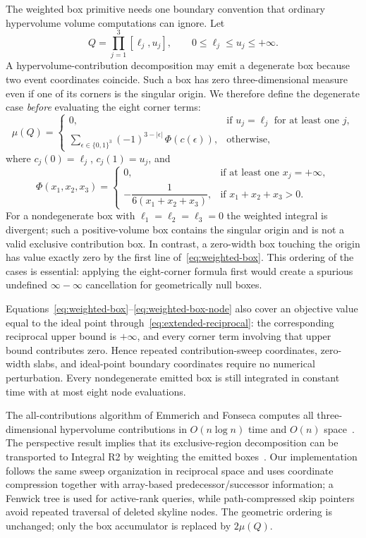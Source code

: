 \documentclass[runningheads]{llncs}
\begin{document}
The weighted box primitive needs one boundary convention that ordinary hypervolume volume computations can ignore. Let
\[
    Q=\prod_{j=1}^{3}[\ell_j,u_j],
    \qquad 0\le \ell_j\le u_j\le +\infty.
\]
A hypervolume-contribution decomposition may emit a degenerate box because two event coordinates coincide. Such a box has zero three-dimensional measure even if one of its corners is the singular origin. We therefore define the degenerate case \emph{before} evaluating the eight corner terms:
\begin{equation}
\label{eq:weighted-box}
\mu(Q)=
\begin{cases}
0,
& \text{if }u_j=\ell_j\text{ for at least one }j,\\[1mm]
\displaystyle
\sum_{\epsilon\in\{0,1\}^3}
(-1)^{3-|\epsilon|}\,\Phi\!\left(c(\epsilon)\right),
& \text{otherwise},
\end{cases}
\end{equation}
where $c_j(0)=\ell_j$, $c_j(1)=u_j$, and
\begin{equation}
\label{eq:weighted-box-node}
\Phi(x_1,x_2,x_3)=
\begin{cases}
0, & \text{if at least one }x_j=+\infty,\\[1mm]
-\dfrac{1}{6(x_1+x_2+x_3)},
& \text{if }x_1+x_2+x_3>0.
\end{cases}
\end{equation}
For a nondegenerate box with $\ell_1=\ell_2=\ell_3=0$ the weighted integral is divergent; such a positive-volume box contains the singular origin and is not a valid exclusive contribution box. In contrast, a zero-width box touching the origin has value exactly zero by the first line of~\eqref{eq:weighted-box}. This ordering of the cases is essential: applying the eight-corner formula first would create a spurious undefined $\infty-\infty$ cancellation for geometrically null boxes.

Equations~\eqref{eq:weighted-box}--\eqref{eq:weighted-box-node} also cover an objective value equal to the ideal point through~\eqref{eq:extended-reciprocal}: the corresponding reciprocal upper bound is $+\infty$, and every corner term involving that upper bound contributes zero. Hence repeated contribution-sweep coordinates, zero-width slabs, and ideal-point boundary coordinates require no numerical perturbation. Every nondegenerate emitted box is still integrated in constant time with at most eight node evaluations.

The all-contributions algorithm of Emmerich and Fonseca computes all three-dimensional hypervolume contributions in $O(n\log n)$ time and $O(n)$ space~\cite{EmmerichFonseca2011}. The perspective result implies that its exclusive-region decomposition can be transported to Integral R2 by weighting the emitted boxes~\cite{Emmerich2026Perspective}. Our implementation follows the same sweep organization in reciprocal space and uses coordinate compression together with array-based predecessor/successor information; a Fenwick tree is used for active-rank queries, while path-compressed skip pointers avoid repeated traversal of deleted skyline nodes. The geometric ordering is unchanged; only the box accumulator is replaced by $2\mu(Q)$.
\end{document}
